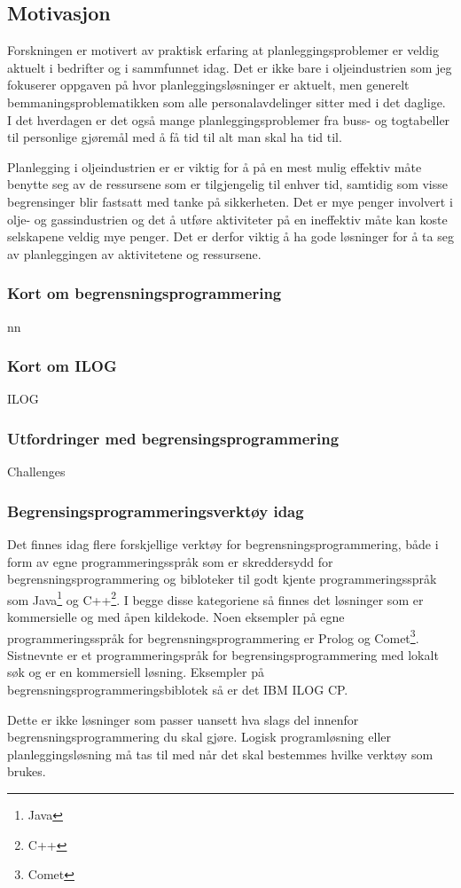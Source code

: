 \subsection{Motivasjon}
Forskningen er motivert av praktisk erfaring at planleggingsproblemer er veldig aktuelt i bedrifter og i sammfunnet idag. Det er ikke bare i oljeindustrien som jeg fokuserer oppgaven på hvor planleggingsløsninger er aktuelt, men generelt bemmaningsproblematikken som alle personalavdelinger sitter med i det daglige. I det hverdagen er det også mange planleggingsproblemer fra buss- og togtabeller til personlige gjøremål med å få tid til alt man skal ha tid til.

Planlegging i oljeindustrien er er viktig for å på en mest mulig effektiv måte benytte seg av de ressursene som er tilgjengelig til enhver tid, samtidig som visse begrensinger blir fastsatt med tanke på sikkerheten. Det er mye penger involvert i olje- og gassindustrien og det å utføre aktiviteter på en ineffektiv måte kan koste selskapene veldig mye penger. Det er derfor viktig å ha gode løsninger for å ta seg av planleggingen av aktivitetene og ressursene.

\subsubsection{Kort om begrensningsprogrammering}
nn

\subsubsection{Kort om ILOG}
ILOG\cite{cpsolverilog}

\subsubsection{Utfordringer med begrensingsprogrammering}
Challenges

\subsubsection{Begrensingsprogrammeringsverktøy idag}
Det finnes idag flere forskjellige verktøy for begrensningsprogrammering, både i form av egne programmeringsspråk som er skreddersydd for begrensningsprogrammering og bibloteker til godt kjente programmeringsspråk som Java\footnote{Java} og C++\footnote{C++}. I begge disse kategoriene så finnes det løsninger som er kommersielle og med åpen kildekode. Noen eksempler på egne programmeringsspråk for begrensningsprogrammering er Prolog og Comet\footnote{Comet}. Sistnevnte er et programmeringspråk for begrensingsprogrammering med lokalt søk og er en kommersiell løsning. Eksempler på begrensningsprogrammeringsbiblotek så er det IBM ILOG CP.

Dette er ikke løsninger som passer uansett hva slags del innenfor begrensningsprogrammering du skal gjøre. Logisk programløsning eller planleggingsløsning må tas til med når det skal bestemmes hvilke verktøy som brukes.